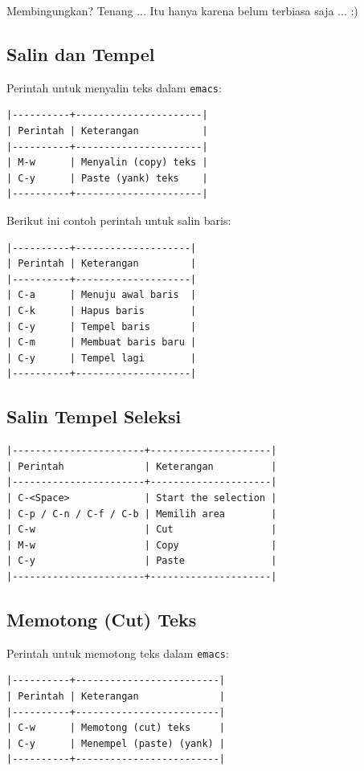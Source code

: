 \documentclass{article}
\begin{document}
Membingungkan? Tenang ... Itu hanya karena belum terbiasa saja ... :)

\subsection{Salin dan Tempel}

Perintah untuk menyalin teks dalam \verb=emacs=:

\begin{verbatim}
|----------+----------------------|
| Perintah | Keterangan           |
|----------+----------------------|
| M-w      | Menyalin (copy) teks |
| C-y      | Paste (yank) teks    |
|----------+----------------------|
\end{verbatim}

Berikut ini contoh perintah untuk salin baris:

\begin{verbatim}
|----------+--------------------|
| Perintah | Keterangan         |
|----------+--------------------|
| C-a      | Menuju awal baris  |
| C-k      | Hapus baris        |
| C-y      | Tempel baris       |
| C-m      | Membuat baris baru |
| C-y      | Tempel lagi        |
|----------+--------------------|
\end{verbatim}

\subsection{Salin Tempel Seleksi}

\begin{verbatim}
|-----------------------+---------------------|
| Perintah              | Keterangan          |
|-----------------------+---------------------|
| C-<Space>             | Start the selection |
| C-p / C-n / C-f / C-b | Memilih area        |
| C-w                   | Cut                 |
| M-w                   | Copy                |
| C-y                   | Paste               |
|-----------------------+---------------------|
\end{verbatim}

\subsection{Memotong (Cut) Teks}

Perintah untuk memotong teks dalam \verb=emacs=:

\begin{verbatim}
|----------+-------------------------|
| Perintah | Keterangan              |
|----------+-------------------------|
| C-w      | Memotong (cut) teks     |
| C-y      | Menempel (paste) (yank) |
|----------+-------------------------|
\end{verbatim}
\end{document}
